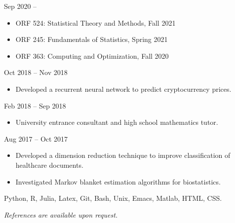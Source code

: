 \documentclass[
  date,
  number,
]{wgu-cv}
\begin{document}


{}
{Sep 2020 --}

\begin{itemize}
  \item
    ORF 524:
    Statistical Theory and Methods,
    Fall 2021
  \item
    ORF 245:
    Fundamentals of Statistics,
    Spring 2021
  \item
    ORF 363:
    Computing and Optimization,
    Fall 2020
\end{itemize}


{}
{Oct 2018 -- Nov 2018}

\begin{itemize}
	\item Developed a recurrent neural network to predict cryptocurrency prices.
\end{itemize}


{}
{Feb 2018 -- Sep 2018}

\begin{itemize}
\item University entrance consultant and high school mathematics tutor.
\end{itemize}


{}
{Aug 2017 -- Oct 2017}

\begin{itemize}
	\item Developed a dimension reduction technique to
    improve classification of healthcare documents.
	\item Investigated Markov blanket estimation algorithms for biostatistics.
\end{itemize}





Python,
R,
Julia,
Latex,
Git,
Bash,
Unix,
Emacs,
Matlab,
HTML,
CSS.




\emph{References are available upon request.}



\end{document}

